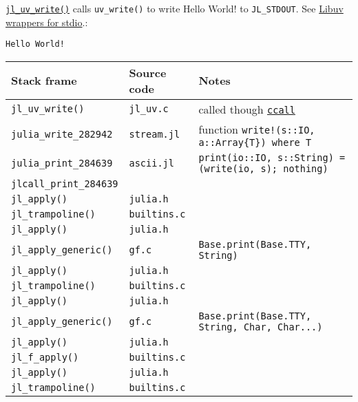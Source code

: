 \href{https://github.com/JuliaLang/julia/blob/master/src/jl\_uv.c}{\texttt{jl\_uv\_write()}} calls \texttt{uv\_write()} to write {\textquotedbl}Hello World!{\textquotedbl} to \texttt{JL\_STDOUT}. See \hyperlink{11668969309999094552}{Libuv wrappers for stdio}.:




\begin{lstlisting}
Hello World!
\end{lstlisting}




\begin{table}[h]

\begin{tabulary}{\linewidth}{|L|L|L|}
\hline
Stack frame & Source code & Notes \\
\hline
\texttt{jl\_uv\_write()} & \texttt{jl\_uv.c} & called though \hyperlink{14245046751182637566}{\texttt{ccall}} \\
\hline
\texttt{julia\_write\_282942} & \texttt{stream.jl} & function \texttt{write!(s::IO, a::Array\{T\}) where T} \\
\hline
\texttt{julia\_print\_284639} & \texttt{ascii.jl} & \texttt{print(io::IO, s::String) = (write(io, s); nothing)} \\
\hline
\texttt{jlcall\_print\_284639} &  &  \\
\hline
\texttt{jl\_apply()} & \texttt{julia.h} &  \\
\hline
\texttt{jl\_trampoline()} & \texttt{builtins.c} &  \\
\hline
\texttt{jl\_apply()} & \texttt{julia.h} &  \\
\hline
\texttt{jl\_apply\_generic()} & \texttt{gf.c} & \texttt{Base.print(Base.TTY, String)} \\
\hline
\texttt{jl\_apply()} & \texttt{julia.h} &  \\
\hline
\texttt{jl\_trampoline()} & \texttt{builtins.c} &  \\
\hline
\texttt{jl\_apply()} & \texttt{julia.h} &  \\
\hline
\texttt{jl\_apply\_generic()} & \texttt{gf.c} & \texttt{Base.print(Base.TTY, String, Char, Char...)} \\
\hline
\texttt{jl\_apply()} & \texttt{julia.h} &  \\
\hline
\texttt{jl\_f\_apply()} & \texttt{builtins.c} &  \\
\hline
\texttt{jl\_apply()} & \texttt{julia.h} &  \\
\hline
\texttt{jl\_trampoline()} & \texttt{builtins.c} &  \\

\end{tabulary}
\end{table}
